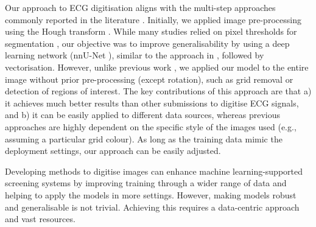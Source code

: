 \documentclass[twocolumn]{cinc}
\begin{document}
Our approach to ECG digitisation aligns with the multi-step approaches commonly reported in the literature \cite{fortune2021digitizing, baydoun2019high, wu2022fully, li2020deep}. Initially, we applied image pre-processing using the Hough transform \cite{baydoun2019high, wu2022fully}. While many studies relied on pixel thresholds for segmentation \cite{baydoun2019high, fortune2021digitizing, wu2022fully}, our objective was to improve generalisability by using a deep learning network (nnU-Net \cite{isensee2021nnu}), similar to the approach in \cite{li2020deep}, followed by vectorisation. However, unlike previous work \cite{li2020deep}, we applied our model to the entire image without prior pre-processing (except rotation), such as grid removal or detection of regions of interest. The key contributions of this approach are that a) it achieves much better results than other submissions to digitise ECG signals, and b) it can be easily applied to different data sources, whereas previous approaches are highly dependent on the specific style of the images used (e.g., assuming a particular grid colour). As long as the training data mimic the deployment settings, our approach can be easily adjusted.


Developing methods to digitise images can enhance machine learning-supported screening systems by improving training through a wider range of data and helping to apply the models in more settings.
However, making models robust and generalisable is not trivial. Achieving this requires a data-centric approach and vast resources.







\end{document}
